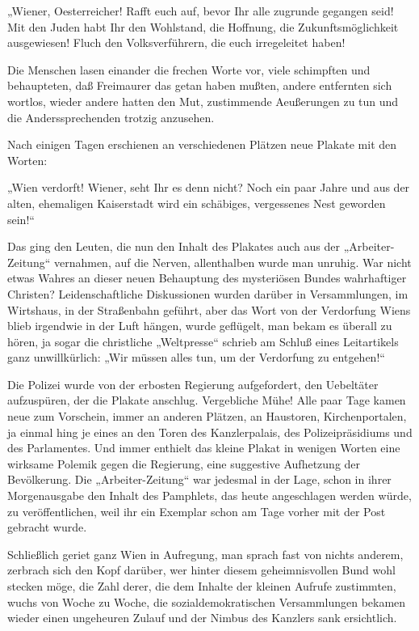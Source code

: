 „Wiener, Oesterreicher! Rafft euch auf, bevor Ihr alle zugrunde
gegangen seid! Mit den Juden habt Ihr den Wohlstand, die Hoffnung,
die Zukunftsmöglichkeit ausgewiesen! Fluch den Volksverführern, die
euch irregeleitet haben!


Die Menschen lasen einander die frechen Worte vor, viele schimpften
und behaupteten, daß Freimaurer das getan haben mußten, andere
entfernten sich wortlos, wieder andere hatten den Mut, zustimmende
Aeußerungen zu tun und die Anderssprechenden trotzig anzusehen.

Nach einigen Tagen erschienen an verschiedenen Plätzen neue Plakate
mit den Worten:

„Wien verdorft! Wiener, seht Ihr es denn nicht? Noch ein paar Jahre
und aus der alten, ehemaligen Kaiserstadt wird ein schäbiges,
vergessenes Nest geworden sein!“

Das ging den Leuten, die nun den Inhalt des Plakates auch aus der
„Arbeiter-Zeitung“ vernahmen, auf die Nerven, allenthalben wurde
man unruhig. War nicht etwas Wahres an dieser neuen Behauptung des
mysteriösen Bundes wahrhaftiger Christen? Leidenschaftliche
Diskussionen wurden darüber in Versammlungen, im Wirtshaus, in der
Straßenbahn geführt, aber das Wort  von der
Verdorfung Wiens blieb irgendwie in der Luft hängen, wurde
geflügelt, man bekam es überall zu hören, ja sogar die christliche
„Weltpresse“ schrieb am Schluß eines Leitartikels ganz
unwillkürlich: „Wir müssen alles tun, um der Verdorfung zu
entgehen!“

Die Polizei wurde von der erbosten Regierung aufgefordert, den
Uebeltäter aufzuspüren, der die Plakate anschlug. Vergebliche Mühe!
Alle paar Tage kamen neue zum Vorschein, immer an anderen Plätzen,
an Haustoren, Kirchenportalen, ja einmal hing je eines an den Toren
des Kanzlerpalais, des Polizeipräsidiums und des Parlamentes. Und
immer enthielt das kleine Plakat in wenigen Worten eine wirksame
Polemik gegen die Regierung, eine suggestive Aufhetzung der
Bevölkerung. Die „Arbeiter-Zeitung“ war jedesmal in der Lage, schon
in ihrer Morgenausgabe den Inhalt des Pamphlets, das heute
angeschlagen werden würde, zu veröffentlichen, weil ihr ein
Exemplar schon am Tage vorher mit der Post gebracht wurde.

Schließlich geriet ganz Wien in Aufregung, man sprach fast von
nichts anderem, zerbrach sich den Kopf darüber, wer hinter diesem
geheimnisvollen Bund wohl stecken möge, die Zahl derer, die dem
Inhalte der kleinen Aufrufe zustimmten, wuchs von Woche zu Woche,
die sozialdemokratischen Versammlungen bekamen wieder einen
ungeheuren Zulauf und der Nimbus des Kanzlers sank ersichtlich.

